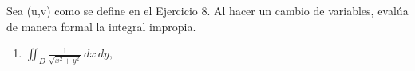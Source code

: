 Sea (u,v) como se define en el Ejercicio 8. Al hacer un cambio de variables, evalúa de manera formal la integral impropia.
\begin{enumerate}[label=(\alph*), itemsep=0.4em, topsep=0.5em]
	\item $\displaystyle \iint_D \frac{1}{\sqrt{x^2 + y^2}} \, dx \, dy,$
\end{enumerate}
